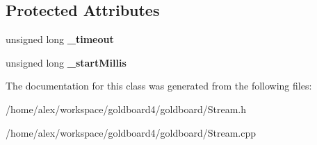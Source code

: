 \subsection*{Protected Attributes}
\begin{DoxyCompactItemize}
\item 
unsigned long {\bfseries \+\_\+timeout}\hypertarget{class_stream_aae48f1a926d2e82a452f2c75af0c6a29}{}\label{class_stream_aae48f1a926d2e82a452f2c75af0c6a29}

\item 
unsigned long {\bfseries \+\_\+start\+Millis}\hypertarget{class_stream_abf61d2006d28d18f2e028285a323fe5a}{}\label{class_stream_abf61d2006d28d18f2e028285a323fe5a}

\end{DoxyCompactItemize}


The documentation for this class was generated from the following files\+:\begin{DoxyCompactItemize}
\item 
/home/alex/workspace/goldboard4/goldboard/Stream.\+h\item 
/home/alex/workspace/goldboard4/goldboard/Stream.\+cpp\end{DoxyCompactItemize}
